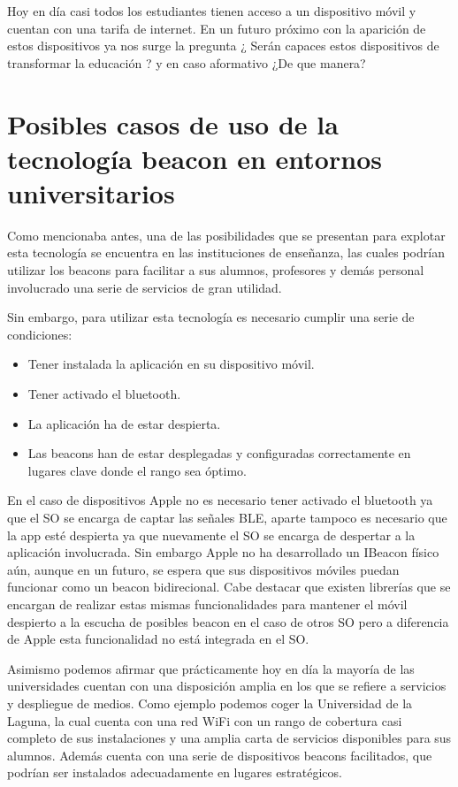  Hoy en día casi todos los estudiantes tienen acceso a un dispositivo móvil y cuentan con una tarifa de internet. En un futuro próximo con la aparición de estos dispositivos ya nos surge la pregunta ¿ Serán capaces estos dispositivos de transformar la educación ? y en caso aformativo ¿De que manera? 

\section {Posibles casos de uso de la tecnología beacon en entornos universitarios}

Como mencionaba antes, una de las posibilidades que se presentan para explotar esta tecnología se encuentra en las instituciones de enseñanza, las cuales podrían utilizar los beacons para facilitar a sus alumnos, profesores y demás personal involucrado  una serie de servicios de gran utilidad.

Sin embargo, para utilizar esta tecnología es necesario cumplir una serie de condiciones:

\begin{itemize}
\item Tener instalada la aplicación en su dispositivo móvil.
\item Tener activado el bluetooth.
\item La aplicación ha de estar despierta.
\item Las beacons han de estar desplegadas y configuradas correctamente en lugares clave donde el rango sea óptimo.
\end{itemize}

En el caso de dispositivos Apple no es necesario tener activado el bluetooth ya que el SO se encarga de captar las señales BLE, aparte tampoco es necesario que la app esté despierta ya que nuevamente el SO se encarga de despertar a la aplicación involucrada. Sin embargo Apple no ha desarrollado un IBeacon físico aún, aunque en un futuro, se espera que sus dispositivos móviles puedan funcionar como un beacon bidirecional. Cabe destacar que existen librerías que se encargan de realizar estas mismas funcionalidades para mantener el móvil despierto a la escucha de posibles beacon en el caso de otros SO pero a diferencia de Apple esta funcionalidad no está integrada en el SO.

Asimismo podemos afirmar que prácticamente hoy en día la mayoría de las universidades cuentan con una disposición amplia en los que se refiere a servicios y despliegue de medios. Como ejemplo podemos coger la Universidad de la Laguna, la cual cuenta con una red WiFi con un rango de cobertura casi completo de sus instalaciones y una amplia carta de servicios disponibles para sus alumnos. Además cuenta con una serie de dispositivos beacons facilitados, que podrían ser instalados adecuadamente en lugares estratégicos. 

